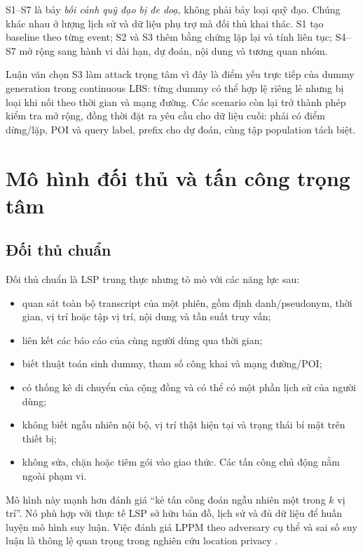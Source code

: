 \documentclass[12pt,a4paper,oneside]{report}
\begin{document}
S1--S7 là bảy \emph{bối cảnh quỹ đạo bị đe doạ}, không phải bảy loại quỹ đạo. Chúng khác nhau ở lượng lịch sử và dữ liệu phụ trợ mà đối thủ khai thác. S1 tạo baseline theo từng event; S2 và S3 thêm bằng chứng lặp lại và tính liên tục; S4--S7 mở rộng sang hành vi dài hạn, dự đoán, nội dung và tương quan nhóm.

Luận văn chọn S3 làm attack trọng tâm vì đây là điểm yếu trực tiếp của dummy generation trong continuous LBS: từng dummy có thể hợp lệ riêng lẻ nhưng bị loại khi nối theo thời gian và mạng đường. Các scenario còn lại trở thành phép kiểm tra mở rộng, đồng thời đặt ra yêu cầu cho dữ liệu cuối: phải có điểm dừng/lặp, POI và query label, prefix cho dự đoán, cùng tập population tách biệt.

\chapter{Mô hình đối thủ và tấn công trọng tâm}

\section{Đối thủ chuẩn}

Đối thủ chuẩn là LSP trung thực nhưng tò mò với các năng lực sau:

\begin{itemize}
  \item quan sát toàn bộ transcript của một phiên, gồm định danh/pseudonym, thời gian, vị trí hoặc tập vị trí, nội dung và tần suất truy vấn;
  \item liên kết các báo cáo của cùng người dùng qua thời gian;
  \item biết thuật toán sinh dummy, tham số công khai và mạng đường/POI;
  \item có thống kê di chuyển của cộng đồng và có thể có một phần lịch sử của người dùng;
  \item không biết ngẫu nhiên nội bộ, vị trí thật hiện tại và trạng thái bí mật trên thiết bị;
  \item không sửa, chặn hoặc tiêm gói vào giao thức. Các tấn công chủ động nằm ngoài phạm vi.
\end{itemize}

Mô hình này mạnh hơn đánh giá ``kẻ tấn công đoán ngẫu nhiên một trong $k$ vị trí''. Nó phù hợp với thực tế LSP sở hữu bản đồ, lịch sử và đủ dữ liệu để huấn luyện mô hình suy luận. Việc đánh giá LPPM theo adversary cụ thể và sai số suy luận là thông lệ quan trọng trong nghiên cứu location privacy \citep{shokri2011quantifying}.
\end{document}
